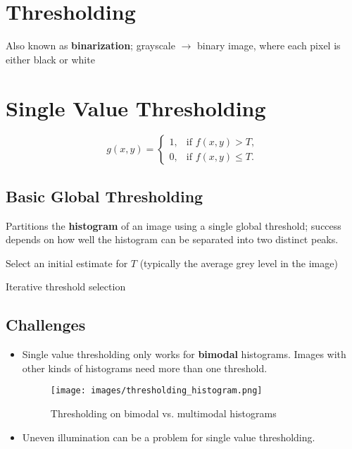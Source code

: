\section*{Thresholding}

Also known as \textbf{binarization}; grayscale $\rightarrow$ binary
image, where each pixel is either black or white

\section*{Single Value Thresholding}

\begin{equation*}
  g(x,y) =
  \begin{cases}
    1, & \text{if } f(x,y) > T,\\
    0, & \text{if } f(x,y) \le T.
  \end{cases}
\end{equation*}

\subsection*{Basic Global Thresholding}

Partitions the \textbf{histogram} of an image using a single global
threshold; success depends on how well the histogram can be separated
into two distinct peaks.

\begin{algorithm}[ht]
  \SetAlgoLined
  \DontPrintSemicolon
  Select an initial estimate for $T$ (typically the average grey
  level in the image)\;
  \caption{Iterative threshold selection}
\end{algorithm}

\subsection*{Challenges}

\begin{itemize}

  \item Single value thresholding only works for \textbf{bimodal}
    histograms. Images with other kinds of histograms need more than
    one threshold.

    \begin{figure}[H]
      \centering
      \texttt{[image: images/thresholding\_histogram.png]}
      \caption{Thresholding on bimodal vs. multimodal histograms}
    \end{figure}

  \item Uneven illumination can be a problem for single value thresholding.
\end{itemize}

